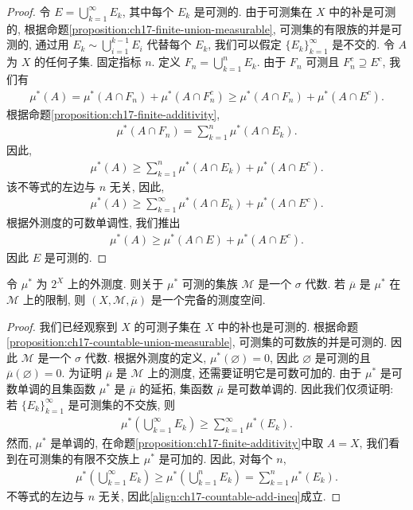 \documentclass[../../main.tex]{subfiles}
\begin{document}
\begin{proof}
令 $E=\bigcup_{k=1}^{\infty}E_{k}$, 其中每个 $E_{k}$ 是可测的. 由于可测集在 $X$ 中的补是可测的, 根据命题\cref{proposition:ch17-finite-union-measurable}, 可测集的有限族的并是可测的, 通过用 $E_{k}\sim\bigcup_{i=1}^{k-1}E_{i}$ 代替每个 $E_{k}$, 我们可以假定 $\{E_{k}\}_{k=1}^{\infty}$ 是不交的. 令 $A$ 为 $X$ 的任何子集. 固定指标 $n$. 定义 $F_{n}=\bigcup_{k=1}^{n}E_{k}$. 由于 $F_{n}$ 可测且 $F_{n}^{c}\supseteq E^{c}$, 我们有
\begin{align*}
\mu^*(A)=\mu^*(A\cap F_{n})+\mu^*(A\cap F_{n}^{c})\geqslant\mu^*(A\cap F_{n})+\mu^*(A\cap E^{c}).
\end{align*}
根据命题\cref{proposition:ch17-finite-additivity},
\begin{align*}
\mu^*(A\cap F_{n})=\sum_{k=1}^{n}\mu^*(A\cap E_{k}).
\end{align*}
因此,
\begin{align*}
\mu^*(A)\geqslant\sum_{k=1}^{n}\mu^*(A\cap E_{k})+\mu^*(A\cap E^{c}).
\end{align*}
该不等式的左边与 $n$ 无关, 因此,
\begin{align*}
\mu^*(A)\geqslant\sum_{k=1}^{\infty}\mu^*(A\cap E_{k})+\mu^*(A\cap E^{c}).
\end{align*}
根据外测度的可数单调性, 我们推出
\begin{align*}
\mu^*(A)\geqslant\mu^*(A\cap E)+\mu^*(A\cap E^{c}).
\end{align*}
因此 $E$ 是可测的.
\end{proof}

\begin{theorem}\label{theorem:ch17-measure-space}
令 $\mu^*$ 为 $2^{X}$ 上的外测度. 则关于 $\mu^*$ 可测的集族 $\mathcal{M}$ 是一个 $\sigma$ 代数. 若 $\overline{\mu}$ 是 $\mu^*$ 在 $\mathcal{M}$ 上的限制, 则 $(X,\mathcal{M},\overline{\mu})$ 是一个完备的测度空间.
\end{theorem}

\begin{proof}
我们已经观察到 $X$ 的可测子集在 $X$ 中的补也是可测的. 根据命题\cref{proposition:ch17-countable-union-measurable}, 可测集的可数族的并是可测的. 因此 $\mathcal{M}$ 是一个 $\sigma$ 代数. 根据外测度的定义, $\mu^*(\varnothing)=0$, 因此 $\varnothing$ 是可测的且 $\overline{\mu}(\varnothing)=0$. 为证明 $\overline{\mu}$ 是 $\mathcal{M}$ 上的测度, 还需要证明它是可数可加的. 由于 $\mu^*$ 是可数单调的且集函数 $\mu^*$ 是 $\overline{\mu}$ 的延拓, 集函数 $\overline{\mu}$ 是可数单调的. 因此我们仅须证明: 若 $\{E_{k}\}_{k=1}^{\infty}$ 是可测集的不交族, 则
\begin{align}
\mu^*\left(\bigcup_{k=1}^{\infty}E_{k}\right)\geqslant\sum_{k=1}^{\infty}\mu^*(E_{k}).\label{align:ch17-countable-add-ineq}
\end{align}
然而, $\mu^*$ 是单调的, 在命题\cref{proposition:ch17-finite-additivity}中取 $A=X$, 我们看到在可测集的有限不交族上 $\mu^*$ 是可加的. 因此, 对每个 $n$,
\begin{align*}
\mu^*\left(\bigcup_{k=1}^{\infty}E_{k}\right)\geqslant\mu^*\left(\bigcup_{k=1}^{n}E_{k}\right)=\sum_{k=1}^{n}\mu^*(E_{k}).
\end{align*}
不等式的左边与 $n$ 无关, 因此\eqref{align:ch17-countable-add-ineq}成立.
\end{proof}
\end{document}
